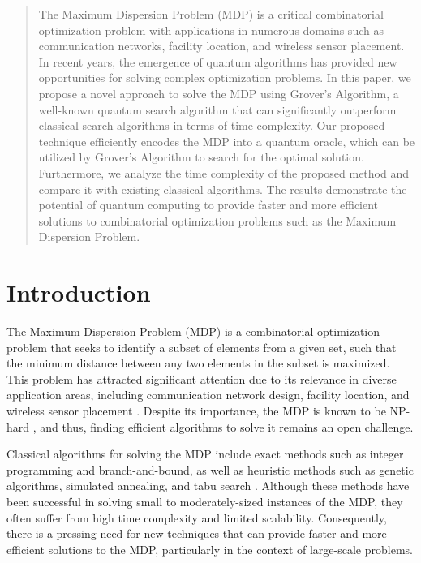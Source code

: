 \begin{abstract}
The Maximum Dispersion Problem (MDP) is a critical combinatorial optimization problem with applications in numerous domains such as communication networks, facility location, and wireless sensor placement. In recent years, the emergence of quantum algorithms has provided new opportunities for solving complex optimization problems. In this paper, we propose a novel approach to solve the MDP using Grover's Algorithm, a well-known quantum search algorithm that can significantly outperform classical search algorithms in terms of time complexity. Our proposed technique efficiently encodes the MDP into a quantum oracle, which can be utilized by Grover's Algorithm to search for the optimal solution. Furthermore, we analyze the time complexity of the proposed method and compare it with existing classical algorithms. The results demonstrate the potential of quantum computing to provide faster and more efficient solutions to combinatorial optimization problems such as the Maximum Dispersion Problem.
\end{abstract}

\section{Introduction}

The Maximum Dispersion Problem (MDP) is a combinatorial optimization problem that seeks to identify a subset of elements from a given set, such that the minimum distance between any two elements in the subset is maximized. This problem has attracted significant attention due to its relevance in diverse application areas, including communication network design, facility location, and wireless sensor placement \cite{erdemir2013efficient}. Despite its importance, the MDP is known to be NP-hard \cite{karp1972reducibility}, and thus, finding efficient algorithms to solve it remains an open challenge.

Classical algorithms for solving the MDP include exact methods such as integer programming and branch-and-bound, as well as heuristic methods such as genetic algorithms, simulated annealing, and tabu search \cite{erdemir2013efficient}. Although these methods have been successful in solving small to moderately-sized instances of the MDP, they often suffer from high time complexity and limited scalability. Consequently, there is a pressing need for new techniques that can provide faster and more efficient solutions to the MDP, particularly in the context of large-scale problems.

